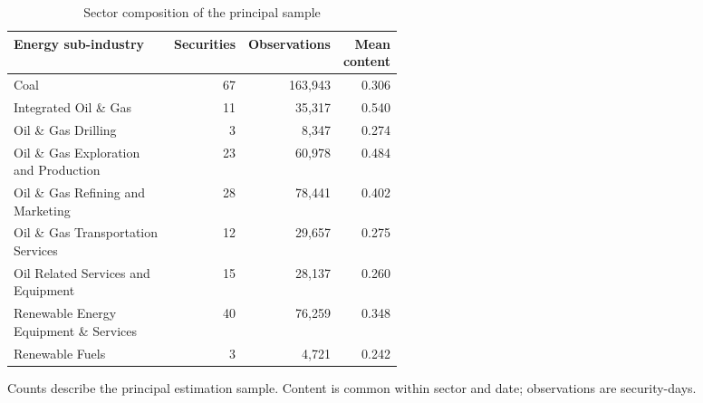 \begin{table}[htbp]
\centering
\caption{Sector composition of the principal sample}
\label{tab:sectors}
\begin{minipage}{\linewidth}
\small
\setlength{\tabcolsep}{4pt}
\begingroup\centering
\begin{tabular}{p{0.50\linewidth}rrr}
\toprule
Energy sub-industry & Securities & Observations & Mean content \\
\midrule
Coal & 67 & 163,943 & 0.306 \\
Integrated Oil \& Gas & 11 & 35,317 & 0.540 \\
Oil \& Gas Drilling & 3 & 8,347 & 0.274 \\
Oil \& Gas Exploration and Production & 23 & 60,978 & 0.484 \\
Oil \& Gas Refining and Marketing & 28 & 78,441 & 0.402 \\
Oil \& Gas Transportation Services & 12 & 29,657 & 0.275 \\
Oil Related Services and Equipment & 15 & 28,137 & 0.260 \\
Renewable Energy Equipment \& Services & 40 & 76,259 & 0.348 \\
Renewable Fuels & 3 & 4,721 & 0.242 \\
\bottomrule
\end{tabular}\par\endgroup
\par\vspace{0.5em}\footnotesize Counts describe the principal estimation sample. Content is common within sector and date; observations are security-days.
\end{minipage}
\end{table}
